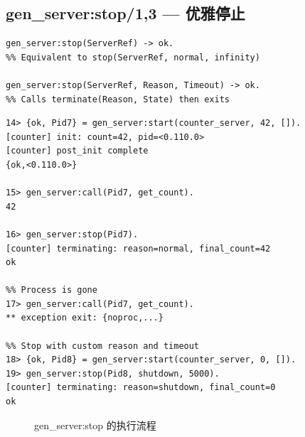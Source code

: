 \documentclass[a4paper,11pt]{article}
\begin{document}
\subsection{gen\_server:stop/1,3 --- 优雅停止}

\begin{lstlisting}[style=erlangstyle, caption={stop 函数签名}]
gen_server:stop(ServerRef) -> ok.
%% Equivalent to stop(ServerRef, normal, infinity)

gen_server:stop(ServerRef, Reason, Timeout) -> ok.
%% Calls terminate(Reason, State) then exits
\end{lstlisting}

\begin{lstlisting}[style=shellstyle, caption={stop 交互演示}]
14> {ok, Pid7} = gen_server:start(counter_server, 42, []).
[counter] init: count=42, pid=<0.110.0>
[counter] post_init complete
{ok,<0.110.0>}

15> gen_server:call(Pid7, get_count).
42

16> gen_server:stop(Pid7).
[counter] terminating: reason=normal, final_count=42
ok

%% Process is gone
17> gen_server:call(Pid7, get_count).
** exception exit: {noproc,...}

%% Stop with custom reason and timeout
18> {ok, Pid8} = gen_server:start(counter_server, 0, []).
19> gen_server:stop(Pid8, shutdown, 5000).
[counter] terminating: reason=shutdown, final_count=0
ok
\end{lstlisting}

\begin{figure}[H]
\centering
{}
\caption{gen\_server:stop 的执行流程}
\label{fig:stop-flow}
\end{figure}
\end{document}
